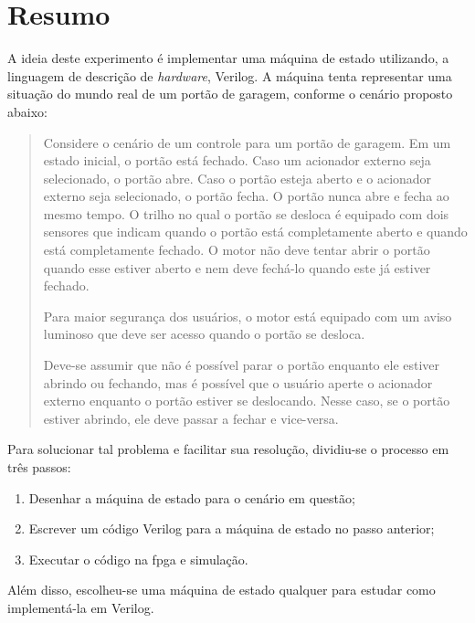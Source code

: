 \chapter{Resumo}
	A ideia deste experimento é implementar uma máquina de estado utilizando, a linguagem de descrição
	de \textit{hardware}, Verilog.
	A máquina tenta representar uma situação do mundo real de um portão de garagem,
	conforme o cenário proposto abaixo:

	\begin{quotation}
		Considere o cenário de um controle para um portão de garagem. Em um estado inicial, o portão
		está fechado. Caso um acionador externo seja selecionado, o portão abre. Caso o portão esteja
		aberto e o acionador externo seja selecionado, o portão fecha. O portão nunca abre e fecha ao
		mesmo tempo. O trilho no qual o portão se desloca é equipado com dois sensores que indicam
		quando o portão está completamente aberto e quando está completamente fechado. O motor
		não deve tentar abrir o portão quando esse estiver aberto e nem deve fechá-lo quando este já
		estiver fechado.

		Para maior segurança dos usuários, o motor está equipado com um aviso luminoso que deve ser
		acesso quando o portão se desloca.

		Deve-se assumir que não é possível parar o portão enquanto ele estiver abrindo ou fechando,
		mas é possível que o usuário aperte o acionador externo enquanto o portão estiver se
		deslocando. Nesse caso, se o portão estiver abrindo, ele deve passar a fechar e vice-versa.
	\end{quotation}

	Para solucionar tal problema e facilitar sua resolução, dividiu-se o processo em três passos:
	\begin{enumerate}
	   \item Desenhar a máquina de estado para o cenário em questão;
	   \item Escrever um código Verilog para a máquina de estado no passo anterior;
	   \item Executar o código na \ac{fpga} e simulação.
	 \end{enumerate}

	 Além disso, escolheu-se uma máquina de estado qualquer para estudar como
	 implementá-la em Verilog.
